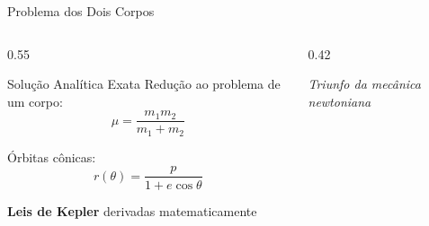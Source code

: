 \documentclass[aspectratio=169,12pt]{beamer}
\begin{document}
\begin{frame}{Problema dos Dois Corpos}
    \begin{columns}[T]
        \begin{column}{0.55\textwidth}
            \begin{block}{Solução Analítica Exata}
                Redução ao problema de um corpo:
                \begin{equation*}
                    \mu = \frac{m_1 m_2}{m_1 + m_2}
                \end{equation*}

                Órbitas cônicas:
                \begin{equation*}
                    r(\theta) = \frac{p}{1 + e\cos\theta}
                \end{equation*}
            \end{block}

            \textbf{Leis de Kepler} derivadas matematicamente
        \end{column}
        \begin{column}{0.42\textwidth}
            \begin{center}
            \end{center}

            \vspace{0.3cm}
            \textit{Triunfo da mecânica newtoniana}
        \end{column}
    \end{columns}
\end{frame}
\end{document}
